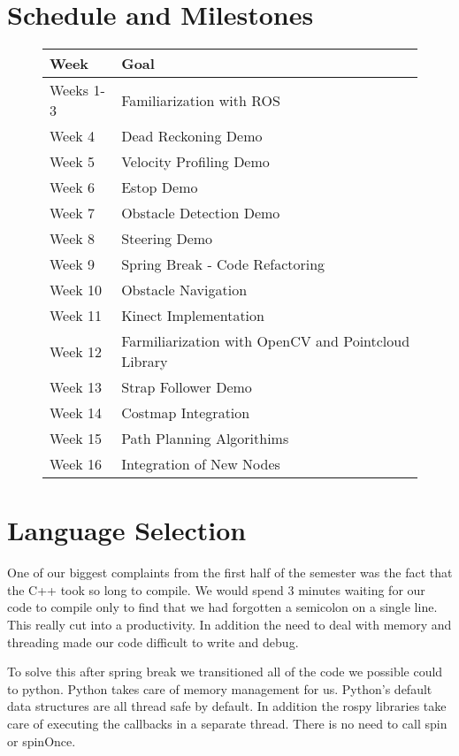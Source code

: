
\newpage
\section{Schedule and Milestones}

\FloatBarrier
\begin{figure}[h]
\begin{longtable}{|l|l|}
  \hline {\bf Week} & {\bf Goal} \\ \hline
Weeks 1-3 & Familiarization with ROS \\ \hline
Week 4 & Dead Reckoning Demo \\ \hline
Week 5 & Velocity Profiling Demo \\ \hline
Week 6 & Estop Demo \\ \hline
Week 7 & Obstacle Detection Demo \\ \hline
Week 8 & Steering Demo \\ \hline
Week 9 & Spring Break - Code Refactoring \\ \hline
Week 10 & Obstacle Navigation \\ \hline
Week 11 & Kinect Implementation \\ \hline
Week 12 & Farmiliarization with OpenCV and Pointcloud Library \\ \hline
Week 13 & Strap Follower Demo \\ \hline
Week 14 & Costmap Integration \\ \hline
Week 15 & Path Planning Algorithims \\ \hline
Week 16 & Integration of New Nodes \\ \hline
\end{longtable}
\end{figure}
\FloatBarrier

\section{Language Selection}

One of our biggest complaints from the first half of the semester was the fact that the C++ took so long to compile. We would spend 3 minutes waiting for our code to compile only to find that we had forgotten a semicolon on a single line. This really cut into a productivity. In addition the need to deal with memory and threading made our code difficult to write and debug.

To solve this after spring break we transitioned all of the code we possible could to python. Python takes care of memory management for us. Python's default data structures are all thread safe by default. In addition the rospy libraries take care of executing the callbacks in a separate thread. There is no need to call spin or spinOnce.

